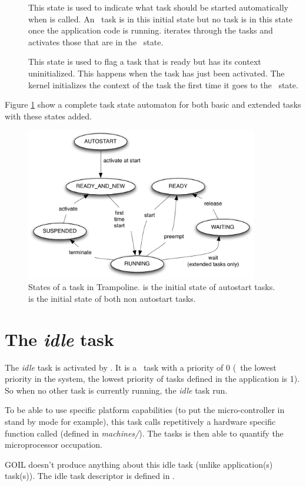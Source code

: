 \begin{description}
\item[\AUTOSTART] This state is used to indicate what task should be started automatically when  is called. An \AUTOSTART\ task is in this initial state but no task is in this state once the application code is running.  iterates through the tasks and activates those that are in the \AUTOSTART\ state.
\item[\READYANDNEW] This state is used to flag a task that is ready but has its context uninitialized. This happens when the task has just been activated. The kernel initializes the context of the task the first time it goes to the \RUNNING\ state.
\end{description}

Figure \ref{fig:states} show a complete task state automaton for both basic and extended tasks with these states added.

\begin{figure}[htbp] %
   \centering
   \includegraphics[width=4in]{pictures/states.pdf} 
   \caption{States of a task in Trampoline.  is the initial state of autostart tasks.  is the initial state of both non autostart tasks.}
   \label{fig:states}
\end{figure} 


\section{The {\em idle} task}

The {\em idle} task is activated by . It is a \BASIC\ task with a priority of 0 (\ie\ the lowest priority in the system, the lowest priority of tasks defined in the application is 1). So when no other task is currently running, the {\em idle} task run.

To be able to use specific platform capabilities (to put the micro-controller in stand by mode for example), this task calls repetitively a hardware specific function called  (defined in \textit{machines/}). The tasks is then able to quantify the microprocessor occupation.

GOIL doesn't produce anything about this idle task (unlike application(s) task(s)). The idle task descriptor is defined in .